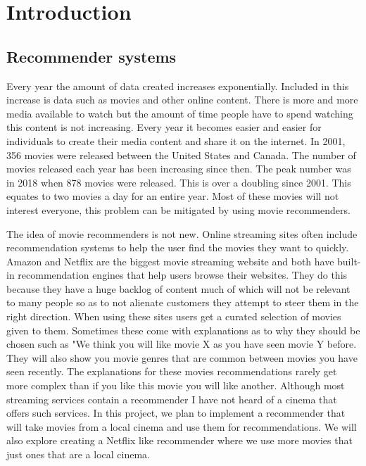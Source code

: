 
\chapter{Introduction}\label{sec:intro}
    

    \section{Recommender systems}
    
        Every year the amount of data created increases exponentially. Included in this increase is data such as movies and other online content. There is more and more media available to watch but the amount of time people have to spend watching this content is not increasing. Every year it becomes easier and easier for individuals to create their media content and share it on the internet. In 2001, 356 movies were released between the United States and Canada. The number of movies released each year has been increasing since then. The peak number was in 2018 when 878 movies were released. This is over a doubling since 2001. \cite{NumberOfMoviesReleased} This equates to two movies a day for an entire year. Most of these movies will not interest everyone, this problem can be mitigated by using movie recommenders. 


        The idea of movie recommenders is not new. Online streaming sites often include recommendation systems to help the user find the movies they want to quickly. Amazon and Netflix are the biggest movie streaming website and both have built-in recommendation engines that help users browse their websites. They do this because they have a huge backlog of content much of which will not be relevant to many people so as to not alienate customers they attempt to steer them in the right direction. When using these sites users get a curated selection of movies given to them. Sometimes these come with explanations as to why they should be chosen such as "We think you will like movie X as you have seen movie Y before. 
        They will also show you movie genres that are common between movies you have seen recently. The explanations for these movies recommendations rarely get more complex than if you like this movie you will like another. Although most streaming services contain a recommender I have not heard of a cinema that offers such services. In this project, we  plan to implement a recommender that will take movies from a local cinema and use them for recommendations. We will also explore creating a Netflix like recommender where we use more movies that just ones that are a local cinema.


